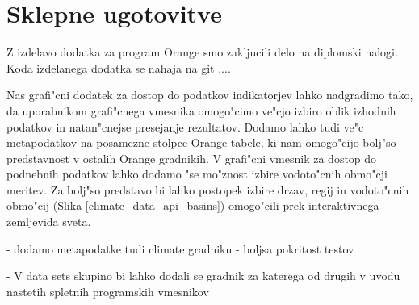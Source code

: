 \chapter{Sklepne ugotovitve}



Z izdelavo dodatka za program Orange smo zakljucili delo na diplomski nalogi.
Koda izdelanega dodatka se nahaja na git ....


% 
%
%
%
%


Nas grafi"cni dodatek za dostop do podatkov indikatorjev lahko nadgradimo tako,
da uporabnikom grafi"cnega vmesnika omogo"cimo ve"cjo izbiro oblik izhodnih
podatkov in natan"cnejse presejanje rezultatov. Dodamo lahko tudi ve"c
metapodatkov na posamezne stolpce Orange tabele, ki nam omogo"cijo bolj"so
predstavnost v ostalih Orange gradnikih. V grafi"cni vmesnik za dostop do
podnebnih podatkov lahko dodamo "se mo"znost izbire vodoto"cnih obmo"cji meritev.
Za bolj"so predstavo bi lahko postopek izbire drzav, regij in vodoto"cnih
obmo"cij (Slika \ref{climate_data_api_basins}) omogo"cili prek interaktivnega zemljevida sveta.


- dodamo metapodatke tudi climate gradniku
- boljsa pokritost testov


- V data sets skupino bi lahko dodali se gradnik za katerega od drugih v uvodu
nastetih spletnih programskih vmesnikov
